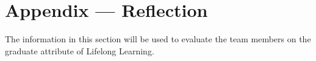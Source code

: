 \documentclass[12pt]{article}
\begin{document}



\newpage




\newpage{}
\section*{Appendix --- Reflection}


The information in this section will be used to evaluate the team members on the
graduate attribute of Lifelong Learning.  




\end{document}
